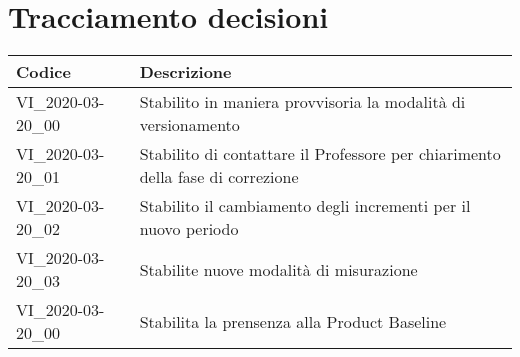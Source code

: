 \section{Tracciamento decisioni}
\renewcommand{\arraystretch}{1.8}

\begin{longtable}{|p{5cm}|p{8cm}|}
	\hline

	\rowcolor{header}
	\textbf{Codice} &  \textbf{Descrizione}\\

	\hline

	VI\_2020-03-20\_00 & Stabilito in maniera provvisoria la modalità di versionamento \\
	VI\_2020-03-20\_01 & Stabilito di contattare il Professore per chiarimento della fase di correzione \\
	VI\_2020-03-20\_02 & Stabilito il cambiamento degli incrementi per il nuovo periodo \\
	VI\_2020-03-20\_03 & Stabilite nuove modalità di misurazione \\
	VI\_2020-03-20\_00 & Stabilita la prensenza alla Product Baseline \\


	\hline
\end{longtable}
